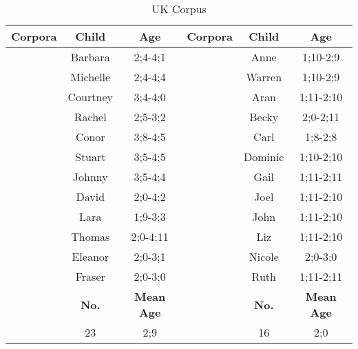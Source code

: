 \begin{table}[!]
\small
\centering
\caption{UK Corpus} 
\begin{tabular}{c|c|c|c|c|c}
\toprule
\textbf{Corpora}  & \textbf{Child}  & \textbf{Age} &
\textbf{Corpora}  & \textbf{Child}  & \textbf{Age}\\
\hline
\multirow{}{}{\cite{henry1995belfast}} & Barbara & 2;4-4;1 & \multirow{}{}{\cite{theakston2001}} & Anne & 1;10-2;9\\
& Michelle & 2;4-4;4 & & Warren& 1;10-2;9 \\
& Courtney & 3;4-4;0 & &Aran & 1;11-2;10\\
 & Rachel & 2;5-3;2 & & Becky & 2;0-2;11\\
 & Conor & 3;8-4;5 &  & Carl & 1;8-2;8\\
& Stuart & 3;5-4;5 & & Dominic & 1;10-2;10\\
 & Johnny & 3;5-4;4 & & Gail & 1;11-2;11\\
 & David & 2;0-4;2 &  & Joel & 1;11-2;10\\
\cite{rowland2006effect} & Lara & 1;9-3;3&  & John &1;11-2;10 \\
\cite{maslen2004dense} & Thomas & 2;0-4;11 & & Liz& 1;11-2;10\\
\multirow{}{}{\cite{lieven2009two}} &Eleanor &2;0-3;1 & & Nicole& 2;0-3;0 \\
&Fraser &2;0-3;0 & & Ruth& 1;11-2;11 \\
\hline
\hline
&\textbf{No.}&\textbf{Mean Age}& &\textbf{No.}&\textbf{Mean Age}\\
\cite{tommerdahl2013analyzing}&23&2;9&\cite{howe1981acquiring}&16&2;0\\
\bottomrule
\end{tabular}
\end{table}


